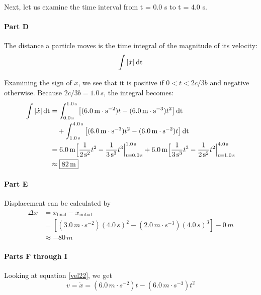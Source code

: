 \documentclass[12pt]{article}
\begin{document}
Next, let us examine the time interval from t = 0.0 s to t = 4.0 s.

\paragraph{Part D}
The distance a particle moves is the time integral of the magnitude of its velocity:
\[
\int |\dot x|\,\rm{d}t
\]

Examining the sign of $\dot x$, we see that it is positive if $0 < t < 2c/3b$ and negative otherwise. Because $2c/3b = 1.0\,\si{s}$, the integral becomes:
\begin{align*}
\int |\dot x|\,\rm{d}t&=\int_{0.0\,\si{s}}^{1.0\,\si{s}} \left[(6.0\,\si{m\cdot s^{-2}}) t - (6.0\,\si{m\cdot s^{-3}})t^2\right]\rm{d}t 
    \\&\quad+ \int_{1.0\,\si{s}}^{4.0\,\si{s}} \left[(6.0\,\si{m\cdot s^{-3}})t^2 - (6.0\,\si{m\cdot s^{-2}}) t\right]\rm{d}t
\\&= 6.0\,\si{m} \Big[\frac{1}{2\,\si{s^2}}t^2-\frac{1}{3\,\si{s^3}}t^3\Big|^{1.0\,\si{s}}_{t=0.0\,\si{s}} + 6.0\,\si{m} \Big[\frac{1}{3\,\si{s^3}}t^3-\frac{1}{2\,\si{s^2}}t^2\Big|^{4.0\,\si{s}}_{t=1.0\,\si{s}}
\\&\approx \boxed{82\,\si{m}}
\end{align*}

\paragraph{Part E} Displacement can be calculated by 
\begin{align*}
\Delta x &= x_\text{final} - x_\text{initial}
\\&= \left[(3.0\,\si{m\cdot s^{-2}}) (4.0\,\si{s})^2 - (2.0\,\si{m\cdot s^{-3}}) (4.0\,\si{s})^3\right] - 0\,\si{m}
\\&\approx \boxed{-80\,\si{m}}
\end{align*}

\paragraph{Parts F through I}
Looking at equation \eqref{vel22}, we get
\[
v = \dot x = (6.0\,\si{m\cdot s^{-2}}) t - (6.0\,\si{m\cdot s^{-3}}) t^2
\]

\end{document}
